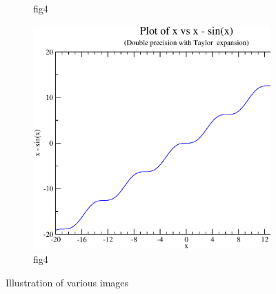 \documentclass{article}
\begin{document}
\begin{figure}[ht!]
\begin{subfigure}[b]{0.5\linewidth}
    \caption{fig4}
    \label{fig7:d}
  \end{subfigure}
  \begin{subfigure}[b]{0.5\linewidth}
    \centering
    \includegraphics[width=0.75\linewidth]{images/d.eps}
    \caption{fig4}
    \label{fig7:d}
  \end{subfigure}
  \caption{Illustration of various images}
  \label{fig7}
\end{figure}
\end{document}
